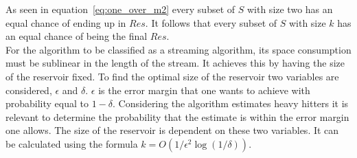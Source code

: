 As seen in equation~\ref{eq:one_over_m2} every subset of \(S\) with size two has an equal chance of ending up in \(Res\). It follows that every subset of \(S\) with size \(k\) has an equal chance of being the final \(Res\). \\

For the algorithm to be classified as a streaming algorithm, its space consumption must be sublinear in the length of the stream. It achieves this by having the size of the reservoir fixed. To find the optimal size of the reservoir two variables are considered, \(\epsilon\) and \(\delta\). \(\epsilon\) is the error margin that one wants to achieve with probability equal to \(1 - \delta\). Considering the algorithm estimates heavy hitters it is relevant to determine the probability that the estimate is within the error margin one allows. The size of the reservoir is dependent on these two variables. It can be calculated using the formula \(k=O\left(1/\epsilon^2\log\left(1/\delta\right)\right)\). 



